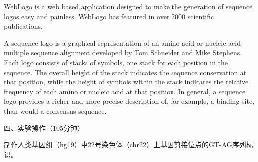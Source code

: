 \documentclass{TIJMUjiaoanSY}
\begin{document}
WebLogo is a web based application designed to make the generation of sequence logos easy and painless. WebLogo has featured in over 2000 scientific publications.

A sequence logo is a graphical representation of an amino acid or nucleic acid multiple sequence alignment developed by Tom Schneider and Mike Stephens. Each logo consists of stacks of symbols, one stack for each position in the sequence. The overall height of the stack indicates the sequence conservation at that position, while the height of symbols within the stack indicates the relative frequency of each amino or nucleic acid at that position. In general, a sequence logo provides a richer and more precise description of, for example, a binding site, than would a consensus sequence.

\otherTail
\newpage
\otherHeader

\noindent
四、实验操作（105分钟）

制作人类基因组（hg19）中22号染色体（chr22）上基因剪接位点的GT-AG序列标识。
\end{document}
